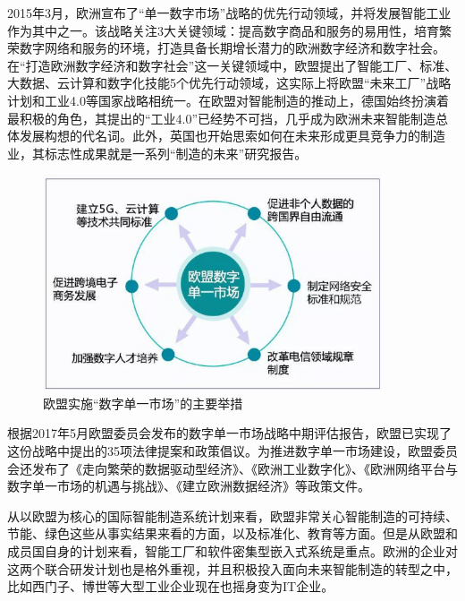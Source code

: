 \documentclass[lang=cn,12pt,bibtex,newtx,twoside,margintrue,citestyle=gb7714-2015, bibstyle=gb7714-2015]{elegantbook}
\begin{document}
\begin{enumerate}
2015年3月，欧洲宣布了“单一数字市场”战略的优先行动领域，并将发展智能工业作为其中之一。该战略关注3大关键领域：提高数字商品和服务的易用性，培育繁荣数字网络和服务的环境，打造具备长期增长潜力的欧洲数字经济和数字社会。在“打造欧洲数字经济和数字社会”这一关键领域中，欧盟提出了智能工厂、标准、大数据、云计算和数字化技能5个优先行动领域，这实际上将欧盟“未来工厂”战略计划和工业4.0等国家战略相统一。在欧盟对智能制造的推动上，德国始终扮演着最积极的角色，其提出的“工业4.0”已经势不可挡，几乎成为欧洲未来智能制造总体发展构想的代名词。此外，英国也开始思索如何在未来形成更具竞争力的制造业，其标志性成果就是一系列“制造的未来”研究报告。

\begin{figure}[htbp]
\centering
\includegraphics[angle=0,width=10cm]{./figure/4.3.png}
\caption{\label{4.3}欧盟实施“数字单一市场”的主要举措}
\end{figure}


根据2017年5月欧盟委员会发布的数字单一市场战略中期评估报告，欧盟已实现了这份战略中提出的35项法律提案和政策倡议。为推进数字单一市场建设，欧盟委员会还发布了《走向繁荣的数据驱动型经济》、《欧洲工业数字化》、《欧洲网络平台与数字单一市场的机遇与挑战》、《建立欧洲数据经济》等政策文件。

从以欧盟为核心的国际智能制造系统计划来看，欧盟非常关心智能制造的可持续、节能、绿色这些从事实结果来看的方面，以及标准化、教育等方面。但是从欧盟和成员国自身的计划来看，智能工厂和软件密集型嵌入式系统是重点。欧洲的企业对这两个联合研发计划也是格外重视，并且积极投入面向未来智能制造的转型之中，比如西门子、博世等大型工业企业现在也摇身变为IT企业。
\end{enumerate}
\end{document}
